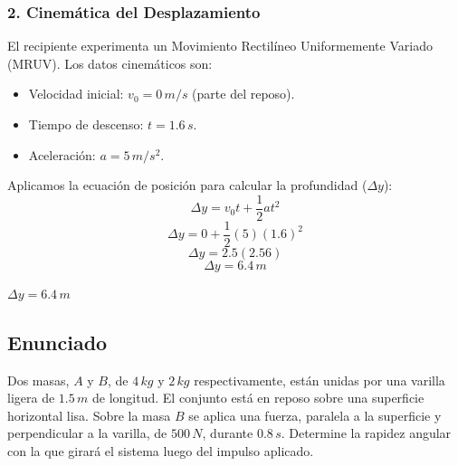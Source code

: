 \documentclass[12pt, a4paper]{article}
\begin{document}
\subsubsection*{2. Cinemática del Desplazamiento}
El recipiente experimenta un Movimiento Rectilíneo Uniformemente Variado (MRUV). Los datos cinemáticos son:
\begin{itemize}
    \item Velocidad inicial: $v_0 = 0 \, \si{m/s}$ (parte del reposo).
    \item Tiempo de descenso: $t = 1.6 \, \si{s}$.
    \item Aceleración: $a = 5 \, \si{m/s^2}$.
\end{itemize}

Aplicamos la ecuación de posición para calcular la profundidad ($\Delta y$):
$$\Delta y = v_0 t + \frac{1}{2} a t^2$$
$$\Delta y = 0 + \frac{1}{2} (5) (1.6)^2$$
$$\Delta y = 2.5 (2.56)$$
$$\Delta y = 6.4 \, \si{m}$$

\begin{tcolorbox}[colback=green!5!white, colframe=green!50!black, title=Respuesta Final]
\centering \Large $\Delta y = 6.4 \, \si{m}$
\end{tcolorbox}

\newpage

\subsection*{Enunciado}
Dos masas, $A$ y $B$, de $4 \, \si{kg}$ y $2 \, \si{kg}$ respectivamente, están unidas por una varilla ligera de $1.5 \, \si{m}$ de longitud. El conjunto está en reposo sobre una superficie horizontal lisa. Sobre la masa $B$ se aplica una fuerza, paralela a la superficie y perpendicular a la varilla, de $500 \, \si{N}$, durante $0.8 \, \si{s}$. Determine la rapidez angular con la que girará el sistema luego del impulso aplicado.

\begin{center}
\end{center}
\end{document}
